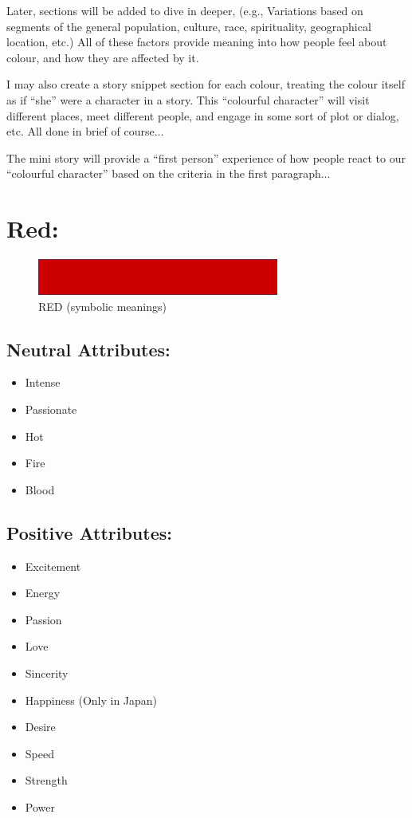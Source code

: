 \documentclass[openleft,oneside,showtrims]{memoir}
\begin{document}
Later, sections will be added to dive in deeper, (e.g., Variations based on segments of the general population, culture, race, spirituality, geographical location, etc.) All of these factors provide meaning into how people feel about colour, and how they are affected by it.

I may also create a story snippet section for each colour, treating the colour itself as if ``she'' were a character in a story.  This ``colourful character'' will visit different places, meet different people, and engage in some sort of plot or dialog, etc. All done in brief of course... 

The mini story will provide a ``first person'' experience of how people react to our ``colourful character'' based on the criteria in the first paragraph...

\section{Red:}
\label{sec:org1bb94dc}

\begin{figure}[htbp]
\centering
\includegraphics[width=300px]{./media/red-banner.png}
\caption{\label{fig:HAP-WR-001}RED (symbolic meanings)}
\end{figure}

\subsection{Neutral Attributes:}
\label{sec:orgfb9e379}

\begin{itemize}
\item Intense
\item Passionate
\item Hot
\item Fire
\item Blood
\end{itemize}

\subsection{Positive Attributes:}
\label{sec:org7936181}

\begin{itemize}
\item Excitement
\item Energy
\item Passion
\item Love
\item Sincerity
\item Happiness (Only in Japan)
\item Desire
\item Speed
\item Strength
\item Power
\end{itemize}
\end{document}
